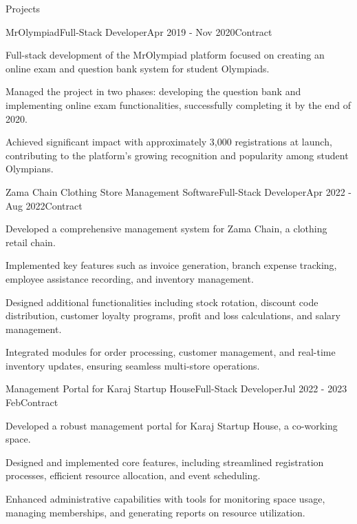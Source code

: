 \documentclass[]{kyvernitis-resume}
\begin{document}
\begin{section}{Projects}
    \begin{subsection}{MrOlympiad}{Full-Stack Developer}{Apr 2019 - Nov 2020}{Contract}{}
		\item Full-stack development of the MrOlympiad platform  
 focused on creating an online exam and question bank system for student Olympiads.
		\item Managed the project in two phases: developing the question bank and implementing online exam functionalities, successfully completing it by the end of 2020.
		\item Achieved significant impact with approximately 3,000 registrations at launch, contributing to the platform’s growing recognition and popularity among student Olympians.

    \end{subsection}
    \begin{subsection}{Zama Chain Clothing Store Management Software}{Full-Stack Developer}{Apr 2022 - Aug 2022}{Contract}{}
		\item Developed a comprehensive management system for Zama Chain, a clothing retail chain. %
		\item Implemented key features such as invoice generation, branch expense tracking, employee assistance recording, and inventory management.
		\item Designed additional functionalities including stock rotation, discount code distribution, customer loyalty programs, profit and loss calculations, and salary management.
		\item Integrated modules for order processing, customer management, and real-time inventory updates, ensuring seamless multi-store operations.

    \end{subsection}

\begin{subsection}{Management Portal for Karaj Startup House}{Full-Stack Developer}{Jul 2022 - 2023 Feb}{Contract}{}
		\item Developed a robust management portal for Karaj Startup House, a co-working space.
		\item Designed and implemented core features, including streamlined registration processes, efficient resource allocation, and event scheduling.
		\item Enhanced administrative capabilities with tools for monitoring space usage, managing memberships, and generating reports on resource utilization.    
\end{subsection}

    
\end{section}
\end{document}
